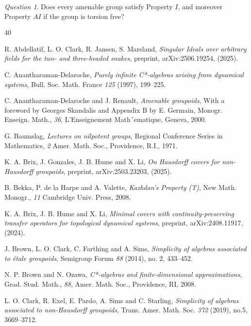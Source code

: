 \documentclass[a4paper, 12pt]{amsart}
\theoremstyle{definition}
\theoremstyle{remark}
\newtheorem{qtn}[thm]{Question}
\numberwithin{equation}{section}
\begin{document}
\begin{qtn}
    Does every amenable group satisfy Property $I$, and moreover Property $AI$ if the group is torsion free?
\end{qtn}


\begin{thebibliography}{40}

     R. Abdellatif, L. O. Clark, R. Jansen, S. Marsland, \emph{Singular Ideals over arbitrary fields for the two- and three-headed snakes}, preprint, arXiv:2506.19254, (2025).

    C. Anantharaman-Delaroche, \emph{Purely infinite C*-algebras arising from dynamical systems}, Bull. Soc. Math. France \emph{125} (1997), 199–225.

     C. Anantharaman-Delaroche and J. Renault, \emph{Amenable groupoids}, With a foreword by Georges Skandalis and Appendix B by E. Germain, Monogr. Enseign. Math., \emph{36}, L’Enseignement Math´ematique, Geneva, 2000.

     G. Baumslag, \emph{Lectures on nilpotent groups}, Regional Conference Series in Mathematics, \emph{2} Amer. Math. Soc., Providence, R.I., 1971.

     K. A. Brix, J. Gonzales, J. B. Hume and X. Li, \emph{On Hausdorff covers for non-Hausdorff groupoids}, preprint, arXiv:2503.23203, (2025).
    
     B. Bekka, P. de la Harpe and A. Valette, \emph{Kazhdan’s Property (T)}, 
    New Math. Monogr., \emph{11}  Cambridge Univ. Press, 2008.
    
     K. A. Brix, J. B. Hume and X. Li, \emph{Minimal covers with continuity-preserving transfer operators for topological dynamical systems}, preprint, arXiv:2408.11917, (2024).

    J. Brown, L. O. Clark, C. Farthing and A. Sims, \emph{Simplicity of algebras associated to \'etale groupoids}, Semigroup Forum \emph{88} (2014), no. 2, 433–452.
    
     N. P. Brown and N. Ozawa, \emph{C*-algebras and finite-dimensional approximations}, Grad. Stud. Math., \emph{88}, Amer. Math. Soc., Providence, RI, 2008.

     L. O. Clark, R. Exel, E. Pardo, A. Sims and C. Starling, \emph{Simplicity of algebras associated to non-Hausdorff groupoids}, Trans. Amer. Math. Soc. \emph{372} (2019), no.5, 3669–3712.
    

\end{thebibliography}
\end{document}
